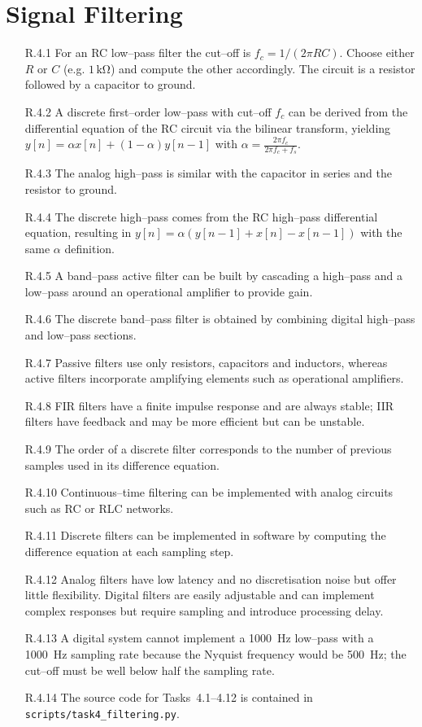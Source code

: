 \section{Signal Filtering}
\begin{enumerate}
\item[R.4.1] For an RC low--pass filter the cut--off is $f_c=1/(2\pi R C)$. Choose either $R$ or $C$ (e.g. $1\,\mathrm{k\Omega}$) and compute the other accordingly. The circuit is a resistor followed by a capacitor to ground.
\item[R.4.2] A discrete first--order low--pass with cut--off $f_c$ can be derived from the differential equation of the RC circuit via the bilinear transform, yielding $y[n]=\alpha x[n]+(1-\alpha) y[n-1]$ with $\alpha=\tfrac{2\pi f_c}{2\pi f_c+f_s}$.
\item[R.4.3] The analog high--pass is similar with the capacitor in series and the resistor to ground.
\item[R.4.4] The discrete high--pass comes from the RC high--pass differential equation, resulting in $y[n]=\alpha(y[n-1]+x[n]-x[n-1])$ with the same $\alpha$ definition.
\item[R.4.5] A band--pass active filter can be built by cascading a high--pass and a low--pass around an operational amplifier to provide gain.
\item[R.4.6] The discrete band--pass filter is obtained by combining digital high--pass and low--pass sections.
\item[R.4.7] Passive filters use only resistors, capacitors and inductors, whereas active filters incorporate amplifying elements such as operational amplifiers.
\item[R.4.8] FIR filters have a finite impulse response and are always stable; IIR filters have feedback and may be more efficient but can be unstable.
\item[R.4.9] The order of a discrete filter corresponds to the number of previous samples used in its difference equation.
\item[R.4.10] Continuous--time filtering can be implemented with analog circuits such as RC or RLC networks.
\item[R.4.11] Discrete filters can be implemented in software by computing the difference equation at each sampling step.
\item[R.4.12] Analog filters have low latency and no discretisation noise but offer little flexibility. Digital filters are easily adjustable and can implement complex responses but require sampling and introduce processing delay.
\item[R.4.13] A digital system cannot implement a 1000~Hz low--pass with a 1000~Hz sampling rate because the Nyquist frequency would be 500~Hz; the cut--off must be well below half the sampling rate.
\item[R.4.14] The source code for Tasks~4.1--4.12 is contained in \texttt{scripts/task4\_filtering.py}.
\end{enumerate}

